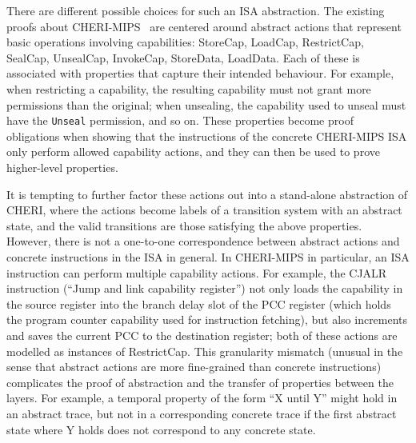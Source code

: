 \documentclass[11pt]{article}
\theoremstyle{definition}
\begin{document}
There are different possible choices for such an ISA abstraction.
The existing proofs about CHERI-MIPS~\cite{cheri-arw18} are centered around abstract actions that represent basic operations involving capabilities:
StoreCap, LoadCap, RestrictCap, SealCap, UnsealCap, InvokeCap, StoreData, LoadData.
Each of these is associated with properties that capture their intended behaviour.
For example, when restricting a capability, the resulting capability must not grant more permissions than the original; when unsealing, the capability used to unseal must have the \verb|Unseal|
permission, and so on.
These properties become proof obligations when showing that the instructions of the concrete CHERI-MIPS ISA only perform allowed capability actions, and they can then be used to prove higher-level properties.

It is tempting to further factor these actions out into a stand-alone abstraction of CHERI, where the actions become labels of a transition system with an abstract state, and the valid transitions are those satisfying the above properties.
However, there is not a one-to-one correspondence between abstract actions and
concrete instructions in the ISA in general. In CHERI-MIPS in particular, an ISA instruction can perform multiple capability actions.
For example, the CJALR instruction (``Jump and link capability register'') not only loads the capability in the source register into the branch delay slot of the PCC register (which holds the program counter capability used for instruction fetching), but also increments and saves the current PCC to the destination register; both of these actions are modelled as instances of RestrictCap.
This granularity mismatch (unusual in the sense that abstract actions are more fine-grained than concrete instructions) complicates the proof of abstraction and the transfer of properties between the layers.
For example, a temporal property of the form ``X until Y'' might hold
in an abstract trace, but not in a corresponding concrete trace if the first abstract
state where Y holds does not correspond to any concrete state.
\end{document}
